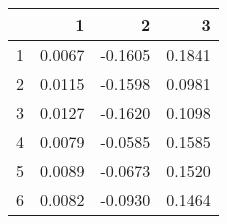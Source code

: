\begin{table}[ht]
\begin{center}
\begin{tabular}{rrrr}
  \hline
 & 1 & 2 & 3 \\ 
  \hline
1 & 0.0067 & -0.1605 & 0.1841 \\ 
  2 & 0.0115 & -0.1598 & 0.0981 \\ 
  3 & 0.0127 & -0.1620 & 0.1098 \\ 
  4 & 0.0079 & -0.0585 & 0.1585 \\ 
  5 & 0.0089 & -0.0673 & 0.1520 \\ 
  6 & 0.0082 & -0.0930 & 0.1464 \\ 
   \hline
\end{tabular}
\end{center}
\end{table}
